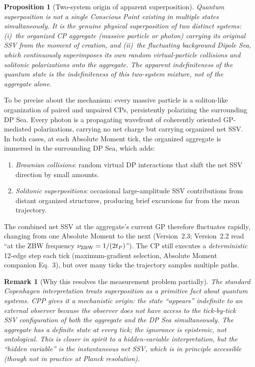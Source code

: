 \documentclass[12pt]{article}
\newtheorem{proposition}[theorem]{Proposition}
\newtheorem{remark}[theorem]{Remark}
\newcommand{\tP}{t_P}
\begin{document}
\begin{proposition}[Two-system origin of apparent superposition]
\label{prop:superposition}
Quantum superposition is not a single Conscious Point existing in multiple
states simultaneously.  It is the genuine physical superposition of two
distinct systems: (i)~the organized CP aggregate (massive particle or photon)
carrying its original SSV from the moment of creation, and (ii)~the
fluctuating background Dipole Sea, which continuously superimposes its own
random virtual-particle collisions and solitonic polarizations onto the
aggregate.  The apparent indefiniteness of the quantum state is the
indefiniteness of this two-system mixture, not of the aggregate alone.
\end{proposition}

To be precise about the mechanism: every massive particle is a soliton-like
organization of paired and unpaired CPs, persistently polarizing the
surrounding DP Sea.  Every photon is a propagating wavefront of coherently
oriented GP-mediated polarizations, carrying no net charge but carrying
organized net SSV.  In both cases, at each Absolute Moment tick, the
organized aggregate is immersed in the surrounding DP Sea, which adds:
\begin{enumerate}[noitemsep]
  \item \emph{Brownian collisions}: random virtual DP interactions that
    shift the net SSV direction by small amounts.
  \item \emph{Solitonic superpositions}: occasional large-amplitude SSV
    contributions from distant organized structures, producing brief
    excursions far from the mean trajectory.
\end{enumerate}
The combined net SSV at the aggregate's current GP therefore fluctuates
rapidly, changing from one Absolute Moment to the next (Version~2.3; Version~2.2 read ``at the ZBW frequency $\nu_{\rm ZBW} = 1/(2\tP)$'').  The CP still
executes a \emph{deterministic} 12-edge step each tick (maximum-gradient
selection, Absolute Moment companion Eq.~3), but over many ticks the
trajectory samples multiple paths.

\begin{remark}[Why this resolves the measurement problem partially]
The standard Copenhagen interpretation treats superposition as a primitive
fact about quantum systems.  CPP gives it a mechanistic origin: the state
``appears'' indefinite to an external observer because the observer does not
have access to the tick-by-tick SSV configuration of both the aggregate and
the DP Sea simultaneously.  The aggregate has a definite state at every tick;
the ignorance is epistemic, not ontological.  This is closer in spirit to a
hidden-variable interpretation, but the ``hidden variable'' is the
instantaneous net SSV, which is in principle accessible (though not in
practice at Planck resolution).
\end{remark}
\end{document}
